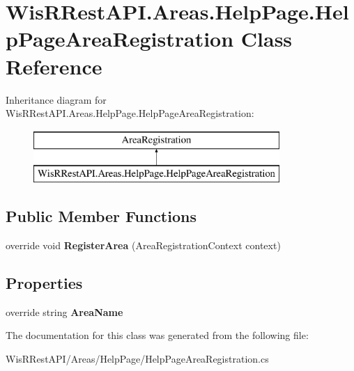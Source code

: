 \hypertarget{class_wis_r_rest_a_p_i_1_1_areas_1_1_help_page_1_1_help_page_area_registration}{}\section{Wis\+R\+Rest\+A\+P\+I.\+Areas.\+Help\+Page.\+Help\+Page\+Area\+Registration Class Reference}
\label{class_wis_r_rest_a_p_i_1_1_areas_1_1_help_page_1_1_help_page_area_registration}
Inheritance diagram for Wis\+R\+Rest\+A\+P\+I.\+Areas.\+Help\+Page.\+Help\+Page\+Area\+Registration\+:\begin{figure}[H]
\begin{center}
\leavevmode
\includegraphics[height=2.000000cm]{class_wis_r_rest_a_p_i_1_1_areas_1_1_help_page_1_1_help_page_area_registration}
\end{center}
\end{figure}
\subsection*{Public Member Functions}
\begin{DoxyCompactItemize}
\item 
\hypertarget{class_wis_r_rest_a_p_i_1_1_areas_1_1_help_page_1_1_help_page_area_registration_a375771d492fb585308e422a0d3e6790b}{}override void {\bfseries Register\+Area} (Area\+Registration\+Context context)\label{class_wis_r_rest_a_p_i_1_1_areas_1_1_help_page_1_1_help_page_area_registration_a375771d492fb585308e422a0d3e6790b}

\end{DoxyCompactItemize}
\subsection*{Properties}
\begin{DoxyCompactItemize}
\item 
\hypertarget{class_wis_r_rest_a_p_i_1_1_areas_1_1_help_page_1_1_help_page_area_registration_afad45468d2e7d8acc7d5f74981e24b5c}{}override string {\bfseries Area\+Name}\label{class_wis_r_rest_a_p_i_1_1_areas_1_1_help_page_1_1_help_page_area_registration_afad45468d2e7d8acc7d5f74981e24b5c}

\end{DoxyCompactItemize}


The documentation for this class was generated from the following file\+:\begin{DoxyCompactItemize}
\item 
Wis\+R\+Rest\+A\+P\+I/\+Areas/\+Help\+Page/Help\+Page\+Area\+Registration.\+cs\end{DoxyCompactItemize}
